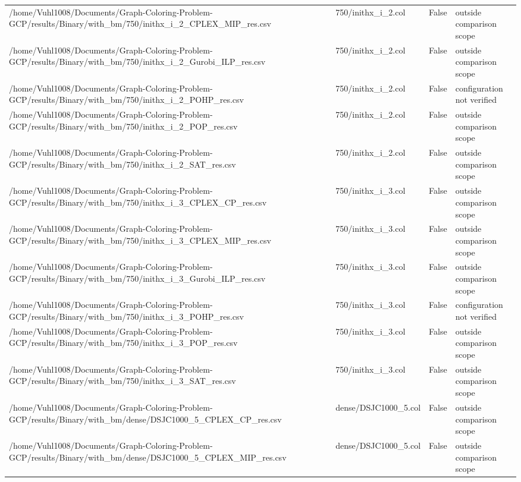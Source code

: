\begin{table}[htbp]
\begin{tabular}{llll}
/home/Vuhl1008/Documents/Graph-Coloring-Problem-GCP/results/Binary/with\_bm/750/inithx\_i\_2\_CPLEX\_MIP\_res.csv & 750/inithx\_i\_2.col & False & outside comparison scope \\
/home/Vuhl1008/Documents/Graph-Coloring-Problem-GCP/results/Binary/with\_bm/750/inithx\_i\_2\_Gurobi\_ILP\_res.csv & 750/inithx\_i\_2.col & False & outside comparison scope \\
/home/Vuhl1008/Documents/Graph-Coloring-Problem-GCP/results/Binary/with\_bm/750/inithx\_i\_2\_POHP\_res.csv & 750/inithx\_i\_2.col & False & configuration not verified \\
/home/Vuhl1008/Documents/Graph-Coloring-Problem-GCP/results/Binary/with\_bm/750/inithx\_i\_2\_POP\_res.csv & 750/inithx\_i\_2.col & False & outside comparison scope \\
/home/Vuhl1008/Documents/Graph-Coloring-Problem-GCP/results/Binary/with\_bm/750/inithx\_i\_2\_SAT\_res.csv & 750/inithx\_i\_2.col & False & outside comparison scope \\
/home/Vuhl1008/Documents/Graph-Coloring-Problem-GCP/results/Binary/with\_bm/750/inithx\_i\_3\_CPLEX\_CP\_res.csv & 750/inithx\_i\_3.col & False & outside comparison scope \\
/home/Vuhl1008/Documents/Graph-Coloring-Problem-GCP/results/Binary/with\_bm/750/inithx\_i\_3\_CPLEX\_MIP\_res.csv & 750/inithx\_i\_3.col & False & outside comparison scope \\
/home/Vuhl1008/Documents/Graph-Coloring-Problem-GCP/results/Binary/with\_bm/750/inithx\_i\_3\_Gurobi\_ILP\_res.csv & 750/inithx\_i\_3.col & False & outside comparison scope \\
/home/Vuhl1008/Documents/Graph-Coloring-Problem-GCP/results/Binary/with\_bm/750/inithx\_i\_3\_POHP\_res.csv & 750/inithx\_i\_3.col & False & configuration not verified \\
/home/Vuhl1008/Documents/Graph-Coloring-Problem-GCP/results/Binary/with\_bm/750/inithx\_i\_3\_POP\_res.csv & 750/inithx\_i\_3.col & False & outside comparison scope \\
/home/Vuhl1008/Documents/Graph-Coloring-Problem-GCP/results/Binary/with\_bm/750/inithx\_i\_3\_SAT\_res.csv & 750/inithx\_i\_3.col & False & outside comparison scope \\
/home/Vuhl1008/Documents/Graph-Coloring-Problem-GCP/results/Binary/with\_bm/dense/DSJC1000\_5\_CPLEX\_CP\_res.csv & dense/DSJC1000\_5.col & False & outside comparison scope \\
/home/Vuhl1008/Documents/Graph-Coloring-Problem-GCP/results/Binary/with\_bm/dense/DSJC1000\_5\_CPLEX\_MIP\_res.csv & dense/DSJC1000\_5.col & False & outside comparison scope \\

\end{tabular}
\end{table}
